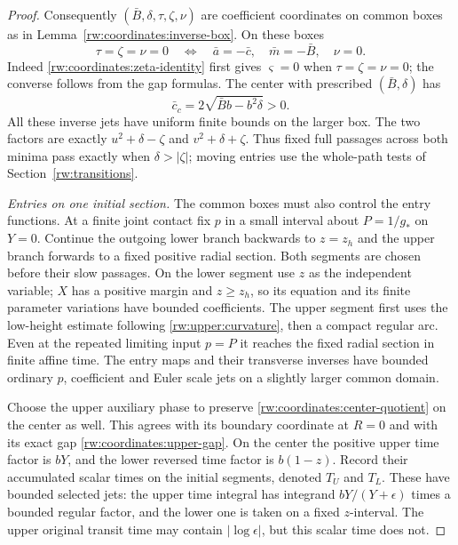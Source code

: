 \begin{proof}
Consequently $(\bar B,\delta,\tau,\zeta,\nu)$ are coefficient
coordinates on common boxes as in
Lemma~\ref{rw:coordinates:inverse-box}. On these boxes
\begin{equation}\label{rw:coordinates:joint-center-axis}
 \tau=\zeta=\nu=0
 \quad\Longleftrightarrow\quad
 \bar a=-\bar c,\quad\bar m=-\bar B,\quad\nu=0.
\end{equation}
Indeed \eqref{rw:coordinates:zeta-identity} first gives
$\varsigma=0$ when $\tau=\zeta=\nu=0$; the converse follows from
the gap formulas. The center with prescribed $(\bar B,\delta)$ has
\begin{equation}\label{rw:coordinates:center-c}
 \bar c_c=2\sqrt{\bar Bb-b^2\delta}>0.
\end{equation}
All these inverse jets have uniform finite bounds on the larger box.
The two factors are exactly $u^2+\delta-\zeta$ and
$v^2+\delta+\zeta$. Thus fixed full passages across both minima
pass exactly when $\delta>|\zeta|$; moving entries use the whole-path tests
of Section~\ref{rw:transitions}.

\par\smallskip\noindent\textit{Entries on one initial section.}
The common boxes must also control the entry functions. At a finite
joint contact fix $p$ in a small interval about $P=1/g_*$ on $Y=0$.
Continue the outgoing lower branch backwards to $z=z_h$ and the upper
branch forwards to a fixed positive radial section. Both segments are
chosen before their slow passages. On the lower segment use $z$ as
the independent variable; $X$ has a positive margin and $z\ge z_h$,
so its equation and its finite parameter variations have bounded
coefficients. The upper segment first uses the low-height estimate
following \eqref{rw:upper:curvature}, then a compact regular arc.
Even at the repeated limiting input $p=P$ it reaches the fixed radial
section in finite affine time. The entry maps and their transverse
inverses have bounded ordinary $p$, coefficient and Euler scale jets
on a slightly larger common domain.

Choose the upper auxiliary phase to preserve
\eqref{rw:coordinates:center-quotient} on the center as well.
This agrees with its boundary coordinate at $R=0$ and with its exact
gap \eqref{rw:coordinates:upper-gap}. On the center the positive
upper time factor is $bY$, and the lower reversed time factor is
$b(1-z)$. Record their accumulated scalar times on the initial
segments, denoted $T_U$ and $T_L$. These have bounded selected jets:
the upper time integral has integrand $bY/(Y+\epsilon)$ times a
bounded regular factor, and the lower one is taken on a fixed
$z$-interval. The upper original transit time may contain
$|\log\epsilon|$, but this scalar time does not.


\end{proof}
